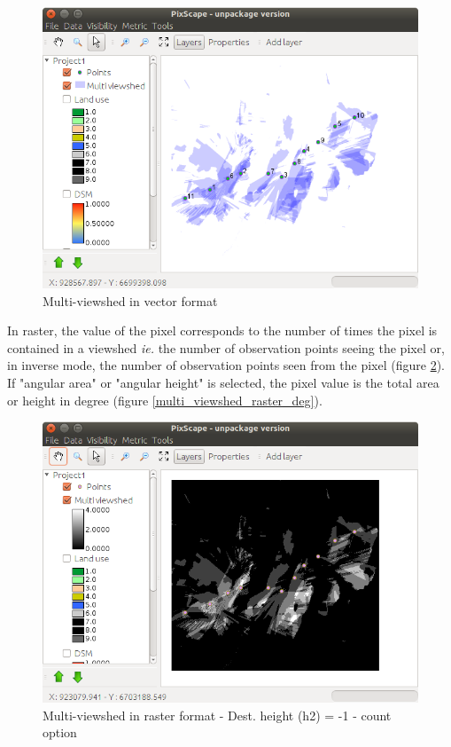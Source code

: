 \documentclass{report}
\begin{document}
\begin{figure}[H]
	\includegraphics[scale=0.5]{img/multi_viewshed_vector-en.png} 
	\caption{Multi-viewshed in vector format}
	\label{multi_viewshed_vector}
\end{figure}

In raster, the value of the pixel corresponds to the number of times the pixel is contained in a viewshed \textit{ie.} the number of observation points seeing the pixel or, in inverse mode, the number of observation points seen from the pixel (figure \ref{multi_viewshed_raster}). 
If "angular area" or "angular height" is selected, the pixel value is the total area or height in degree (figure \ref{multi_viewshed_raster_deg}).

\begin{figure}[H]
	\includegraphics[scale=0.5]{img/multi_viewshed_raster-en.png} 
	\caption{Multi-viewshed in raster format - Dest. height (h2) = -1 - count option}
	\label{multi_viewshed_raster}
\end{figure}
\end{document}

